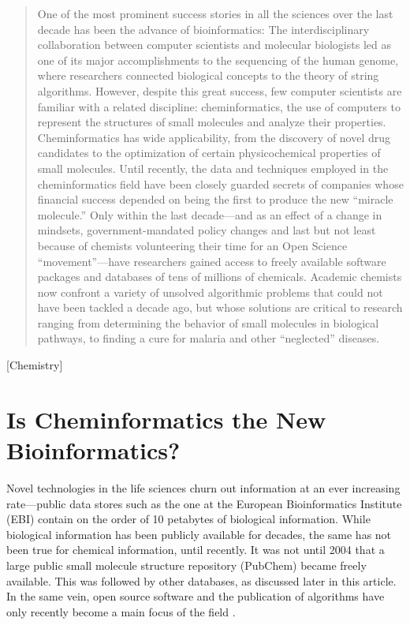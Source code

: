 \documentclass{sig-alternate}
\begin{document}
\maketitle
\begin{abstract}
  One of the most prominent success stories in all the sciences over
  the last decade has been the advance of bioinformatics: The
  interdisciplinary collaboration between computer scientists and
  molecular biologists led as one of its major accomplishments to the
  sequencing of the human genome, where researchers connected
  biological concepts to the theory of string algorithms. However,
  despite this great success, few computer scientists are familiar
  with a related discipline: cheminformatics, the use of computers to
  represent the structures of small molecules and analyze their
  properties.  Cheminformatics has wide applicability, from the
  discovery of novel drug candidates to the optimization of certain
  physicochemical properties of small molecules. Until recently, the
  data and techniques employed in the cheminformatics field have been
  closely guarded secrets of companies whose financial success
  depended on being the first to produce the new ``miracle molecule.''
  Only within the last decade---and as an effect of a change in
  mindsets, government-mandated policy changes and last but not least
  because of chemists volunteering their time for an Open Science
  ``movement''---have researchers gained access to freely available
  software packages and databases of tens of millions of
  chemicals. Academic chemists now confront a variety of unsolved
  algorithmic problems that could not have been tackled a decade ago,
  but whose solutions are critical to research ranging from
  determining the behavior of small molecules in biological pathways,
  to finding a cure for malaria and other ``neglected'' diseases.
\end{abstract}

[Chemistry]

\section{Is Cheminformatics the New \\Bioinformatics?}

Novel technologies in the life sciences churn out information at an
ever increasing rate---public data stores such as the one at the
European Bioinformatics Institute (EBI) contain on the order of 10
petabytes of biological information.  While biological
information has been publicly available for decades, the same has not
been true for chemical information, until recently. It was not until
2004 that a large public small molecule structure repository (PubChem)
became freely available. This was followed by other databases, as
discussed later in this article. In the same vein, open source
software and the publication of algorithms have only recently become a
main focus of the field \cite{faulon2010}.
\end{document}
